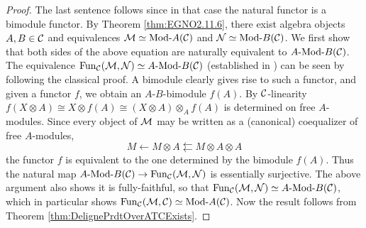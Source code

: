 \documentclass{amsart}
\begin{document}
\begin{proof}
	The last sentence follows since in that case the natural functor is a bimodule functor. By Theorem \ref{thm:EGNO2.11.6}, there exist algebra objects $A, B \in \mathcal C$ and equivalences $\cM \simeq \Mod{}{A}(\cC)$ and $\cN \simeq \Mod{}{B}(\cC)$. We first show that both sides of the above equation are naturally equivalent to $\Mod{A}{B}(\cC)$. The equivalence $\Fun_\cC(\cM, \cN) \simeq \Mod{A}{B}(\cC)$ (established in \cite[Prop 2.12.2]{EGNO}) can be seen by following the classical proof. A bimodule clearly gives rise to such a functor, and given a functor $f$, we obtain an $A$-$B$-bimodule $f(A)$. By $\mathcal C$-linearity $f(X \otimes A) \cong X \otimes f(A)  \cong (X \otimes A) \otimes_A f(A) $ is determined on free $A$-modules. Since every object of $\mathcal M$ may be written as a (canonical) coequalizer of free $A$-modules,
	\begin{equation*}
		M \leftarrow M \otimes A \leftleftarrows M \otimes A \otimes A
	\end{equation*} 
the functor $f$ is equivalent to the one determined by the bimodule $f(A)$. Thus the natural map  $\Mod{A}{B}(\cC) \to \Fun_\cC(\cM, \cN)$ is essentially surjective. The above argument also shows it is fully-faithful, so that $\Fun_\cC(\cM, \cN) \simeq \Mod{A}{B}(\cC)$, which in particular shows $\Fun_\cC(\cM, \cC) \simeq \Mod{}{A}(\cC)$. Now the result follows from Theorem \ref{thm:DelignePrdtOverATCExists}.
\end{proof}
\end{document}
